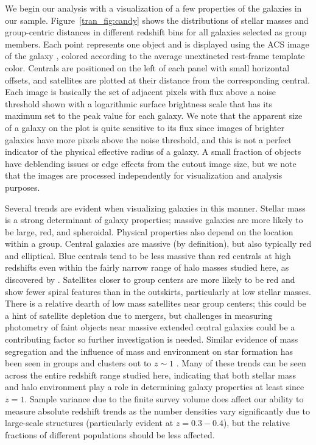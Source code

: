 We begin our analysis with a visualization of a few properties of the
galaxies in our sample. Figure~\ref{tran_fig:candy} shows the distributions
of stellar masses and group-centric distances in different redshift
bins for all galaxies selected as group members. Each point represents
one object and is displayed using the ACS image of the galaxy \citep{Koekemoer2007}, colored
according to the average unextincted rest-frame template \nuvr
color. Centrals are positioned on the left of each panel with small
horizontal offsets, and satellites are plotted at their distance from
the corresponding central. Each image is basically the set of adjacent
pixels with flux above a noise threshold shown with a logarithmic
surface brightness scale that has its maximum set to the peak value
for each galaxy.  We note that the apparent size of a galaxy on the
plot is quite sensitive to its flux since images of brighter galaxies
have more pixels above the noise threshold, and this is not a perfect
indicator of the physical effective radius of a galaxy. A small
fraction of objects have deblending issues or edge effects from the
cutout image size, but we note that the images are processed
independently for visualization and analysis purposes.
 
Several trends are evident when visualizing galaxies in this
manner. Stellar mass is a strong determinant of galaxy properties;
massive galaxies are more likely to be large, red, and
spheroidal. Physical properties also depend on the location within a
group. Central galaxies are massive (by definition), but also
typically red and elliptical. Blue centrals tend to be less massive
than red centrals at high redshifts even within the fairly narrow
range of halo masses studied here, as discovered by
\citet{Tinker2012}. Satellites closer to group centers are more likely
to be red and show fewer spiral features than in the outskirts,
particularly at low stellar masses. There is a relative dearth of low
mass satellites near group centers; this could be a hint of satellite
depletion due to mergers, but challenges in measuring photometry of
faint objects near massive extended central galaxies could be a
contributing factor so further investigation is needed. Similar
evidence of mass segregation and the influence of mass and environment
on star formation has been seen in groups and clusters out to $z\sim
1$ \citep{Muzzin2012, Presotto2012}. Many of these trends can be seen
across the entire redshift range studied here, indicating that both
stellar mass and halo environment play a role in determining galaxy
properties at least since $z=1$. Sample variance due to the finite
survey volume does affect our ability to measure absolute redshift
trends as the number densities vary significantly due to large-scale
structures (particularly evident at $z=0.3-0.4$), but the relative
fractions of different populations should be less affected.

